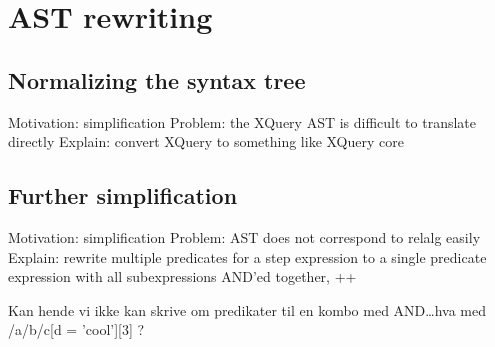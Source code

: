 \section{AST rewriting}
\subsection{Normalizing the syntax tree}
Motivation: simplification
Problem: the XQuery AST is difficult to translate directly
Explain: convert XQuery to something like XQuery core

\subsection{Further simplification}
Motivation: simplification
Problem: AST does not correspond to relalg easily
Explain: rewrite multiple predicates for a step expression to a single 
         predicate expression with all subexpressions AND'ed together, ++
         
Kan hende vi ikke kan skrive om predikater til en kombo med AND\ldots hva med
/a/b/c[d = 'cool'][3] ?
